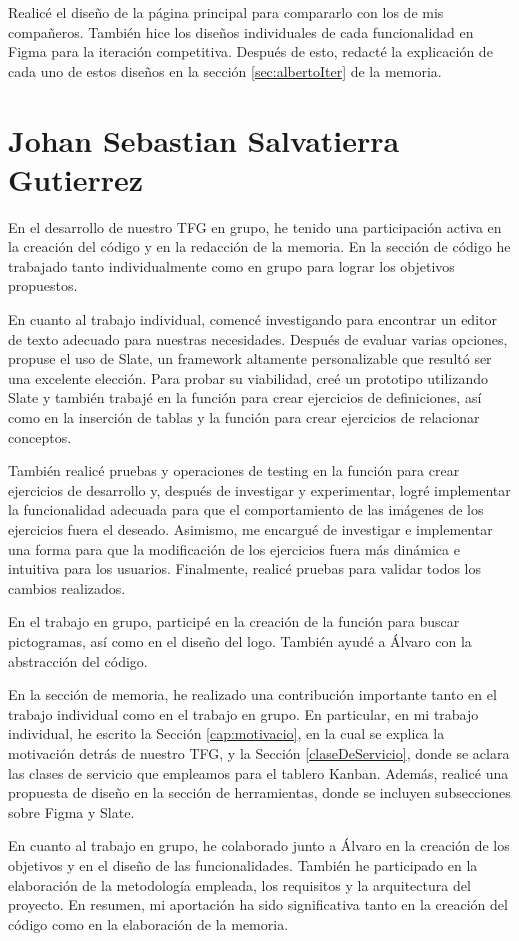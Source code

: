 Realicé el diseño de la página principal para compararlo con los de mis compañeros. También hice los diseños individuales de cada funcionalidad en Figma para la iteración competitiva. Después de esto, redacté la explicación de cada uno de estos diseños en la sección \ref{sec:albertoIter} de la memoria.


\section{Johan Sebastian Salvatierra Gutierrez}
En el desarrollo de nuestro TFG en grupo, he tenido una participación activa en la creación del código y en la redacción de la memoria. En la sección de código he trabajado tanto individualmente como en grupo para lograr los objetivos propuestos.

En cuanto al trabajo individual, comencé investigando para encontrar un editor de texto adecuado para nuestras necesidades. Después de evaluar varias opciones, propuse el uso de Slate, un framework altamente personalizable que resultó ser una excelente elección. Para probar su viabilidad, creé un prototipo utilizando Slate y también trabajé en la función para crear ejercicios de definiciones, así como en la inserción de tablas y la función para crear ejercicios de relacionar conceptos.

También realicé pruebas y operaciones de testing en la función para crear ejercicios de desarrollo y, después de investigar y experimentar, logré implementar la funcionalidad adecuada para que el comportamiento de las imágenes de los ejercicios fuera el deseado. Asimismo, me encargué de investigar e implementar una forma para que la modificación de los ejercicios fuera más dinámica e intuitiva para los usuarios. Finalmente, realicé pruebas para validar todos los cambios realizados.

En el trabajo en grupo, participé en la creación de la función para buscar pictogramas, así como en el diseño del logo. También ayudé a Álvaro con la abstracción del código.

En la sección de memoria, he realizado una contribución importante tanto en el trabajo individual como en el trabajo en grupo. En particular, en mi trabajo individual, he escrito la Sección \ref{cap:motivacio}, en la cual se explica la motivación detrás de nuestro TFG, y la Sección \ref{claseDeServicio}, donde se aclara las clases de servicio que empleamos para el tablero Kanban. Además, realicé una propuesta de diseño en la sección de herramientas, donde se incluyen subsecciones sobre Figma y Slate.

En cuanto al trabajo en grupo, he colaborado junto a Álvaro en la creación de los objetivos y en el diseño de las funcionalidades. También he participado en la elaboración de la metodología empleada, los requisitos y la arquitectura del proyecto. En resumen, mi aportación ha sido significativa tanto en la creación del código como en la elaboración de la memoria.